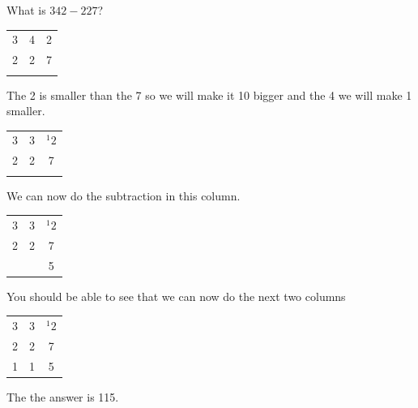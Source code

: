 \begin{exmp}
What is $342 - 227$?

\renewcommand{\arraystretch}{1}
\begin{tabular}{c c c}
	3 & 4 & 2 \\
	2 & 2 & 7 \\
	\hline \hline
	 & & \\
\end{tabular}

The 2 is smaller than the 7 so we will make it 10 bigger and the 4 we will make 1 smaller.

\begin{tabular}{c c c}
	3 & 3 & $^1 2$ \\
	2 & 2 & 7 \\
	\hline \hline
	 & & \\
\end{tabular}
We can now do the subtraction in this column.

\begin{tabular}{c c c}
	3 & 3 & $^1 2$ \\
	2 & 2 & 7 \\
	\hline \hline
	 & & 5\\
\end{tabular}

You should be able to see that we can now do the next two columns

\begin{tabular}{c c c}
	3 & 3 & $^1 2$ \\
	2 & 2 & 7 \\
	\hline \hline
	1 & 1 & 5\\
\end{tabular}

The the answer is 115.
\end{exmp}

